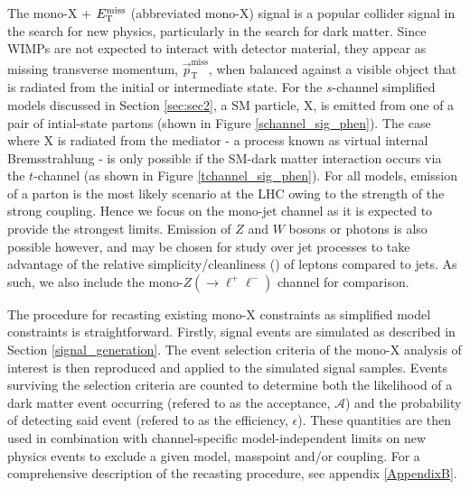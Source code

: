 The mono-X + $E_{\mathrm{T}}^{\mathrm{miss}}$ (abbreviated mono-X) signal is a popular collider signal in the search for new physics, particularly in the search for dark matter. Since WIMPs are not expected to interact with detector material, they appear as missing transverse momentum, $\vec{p}_{\mathrm{T}}^{\mathrm{miss}}$, when balanced against a visible object that is radiated from the initial or intermediate state. 
For the $s$-channel simplified models discussed in Section \ref{sec:sec2}, a SM particle, X, is emitted from one of a pair of intial-state partons (shown in Figure \ref{schannel_sig_phen}). The case where X is radiated from the mediator - a process known as virtual internal Bremsstrahlung - is only possible if the SM-dark matter interaction occurs via the $t$-channel (as shown in Figure \ref{tchannel_sig_phen}). 
For all models, emission of a parton is the most likely scenario at the LHC owing to the strength of the strong coupling. Hence we focus on the mono-jet channel as it is expected to provide the strongest limits. Emission of $Z$ and $W$ bosons or photons is also possible however, and may be chosen for study over jet processes to take advantage of the relative simplicity/cleanliness () of leptons compared to jets. As such, we also include the mono-$Z(\rightarrow \ell^+ \ell^-)$ channel for comparison.




The procedure for recasting existing mono-X constraints as simplified model constraints is straightforward. Firstly, signal events are simulated as described in Section \ref{signal_generation}. The event selection criteria of the mono-X analysis of interest is then reproduced and applied to the simulated signal samples. Events surviving the selection criteria are counted to determine both the likelihood of a dark matter event occurring (refered to as the acceptance, $\mathcal{A}$) and the probability of detecting said event (refered to as the efficiency, $\epsilon$). These quantities are then used in combination with channel-specific model-independent limits on new physics events to exclude a given model, masspoint and/or coupling. For a comprehensive description of the recasting procedure, see appendix \ref{AppendixB}.

